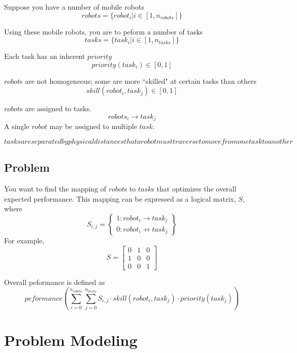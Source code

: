 \documentclass[a4paper]{article}
\begin{document}
Suppose you have a number of mobile robots
$$\mathit{robots} = \{ \mathit{robot}_i | i \in [1, n_\mathit{robots}] \}$$

Using these mobile robots, you are to peform a number of tasks
$$\mathit{tasks} = \{ \mathit{task}_i | i \in [1, n_\mathit{tasks}] \}$$

Each task has an inherent $\mathit{priority}$
$$\mathit{priority}(\mathit{task}_i) \in [0 ,1]$$

$\mathit{robot}$s are not homogeneous; some are more ``skilled" at certain tasks than others
$$\mathit{skill}(\mathit{robot}_i, \mathit{task}_j) \in [0 ,1]$$

$\mathit{robot}$s are assigned to tasks.
$$\mathit{robots}_i \rightarrow \mathit{task}_j$$
A single $\mathit{robot}$ may be assigned to multiple $\mathit{task}$.

$\mathit{tasks} are separated by physical distances that a robot must traverse to move from one task to another$

\subsection{Problem}

You want to find the mapping of $\mathit{robot}$s to $\mathit{task}$s that optimizes the overall expected performance. This mapping can be expressed as a logical matrix, $S$, where
$$S_{i,j} = \left\{
  \begin{array}{lr}
     1 : \mathit{robot}_i \rightarrow \mathit{task}_j \\
     0 : \mathit{robot}_i \not \rightarrow \mathit{task}_j
  \end{array}
\right\}$$
For example,
$$S = \begin{bmatrix}
  0 & 1 & 0 \\
  1 & 0 & 0 \\
  0 & 0 & 1
\end{bmatrix}$$

Overall peformance is defined as
$$
  \mathit{peformance}\left(
    \sum_{i=0}^{n_\mathit{robots}}
    \sum_{j=0}^{n_\mathit{tasks}}
    S_{i,j} \cdot
    \mathit{skill}(\mathit{robot}_i, \mathit{task}_j) \cdot
    \mathit{priority}(\mathit{task}_j)
  \right)
$$

\section{Problem Modeling}

\end{document}

